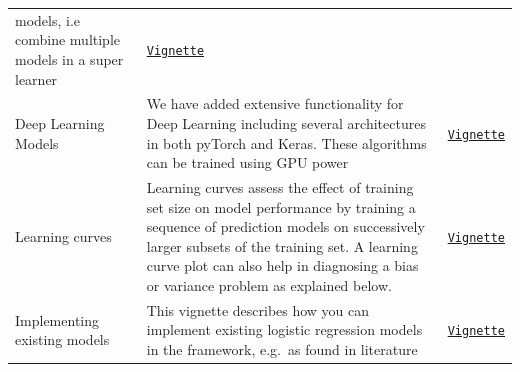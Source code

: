 \documentclass[]{book}
\begin{document}
\begin{longtable}[]{@{}lll@{}}
\begin{minipage}[t]{0.54\columnwidth}
models, i.e combine multiple models in a super learner\strut
\end{minipage} & \begin{minipage}[t]{0.19\columnwidth}\raggedright\strut
\href{https://github.com/OHDSI/PatientLevelPrediction/blob/master/inst/doc/BuildingEnsembleModels.pdf}{\texttt{Vignette}}\strut
\end{minipage}\tabularnewline
\begin{minipage}[t]{0.19\columnwidth}\raggedright\strut
Deep Learning Models\strut
\end{minipage} & \begin{minipage}[t]{0.54\columnwidth}\raggedright\strut
We have added extensive functionality for Deep Learning including
several architectures in both pyTorch and Keras. These algorithms can be
trained using GPU power\strut
\end{minipage} & \begin{minipage}[t]{0.19\columnwidth}\raggedright\strut
\href{https://github.com/OHDSI/PatientLevelPrediction/blob/master/inst/doc/BuildingDeepLearningModels.pdf}{\texttt{Vignette}}\strut
\end{minipage}\tabularnewline
\begin{minipage}[t]{0.19\columnwidth}\raggedright\strut
Learning curves\strut
\end{minipage} & \begin{minipage}[t]{0.54\columnwidth}\raggedright\strut
Learning curves assess the effect of training set size on model
performance by training a sequence of prediction models on successively
larger subsets of the training set. A learning curve plot can also help
in diagnosing a bias or variance problem as explained below.\strut
\end{minipage} & \begin{minipage}[t]{0.19\columnwidth}\raggedright\strut
\href{https://github.com/OHDSI/PatientLevelPrediction/blob/master/inst/doc/GeneratingLearningCurves.pdf}{\texttt{Vignette}}\strut
\end{minipage}\tabularnewline
\begin{minipage}[t]{0.19\columnwidth}\raggedright\strut
Implementing existing models\strut
\end{minipage} & \begin{minipage}[t]{0.54\columnwidth}\raggedright\strut
This vignette describes how you can implement existing logistic
regression models in the framework, e.g.~as found in literature\strut
\end{minipage} & \begin{minipage}[t]{0.19\columnwidth}\raggedright\strut
\href{https://github.com/OHDSI/PatientLevelPrediction/blob/master/inst/doc/ImplementingExistingModels.pdf}{\texttt{Vignette}}\strut
\end{minipage}\tabularnewline
\bottomrule
\end{longtable}
\end{document}
